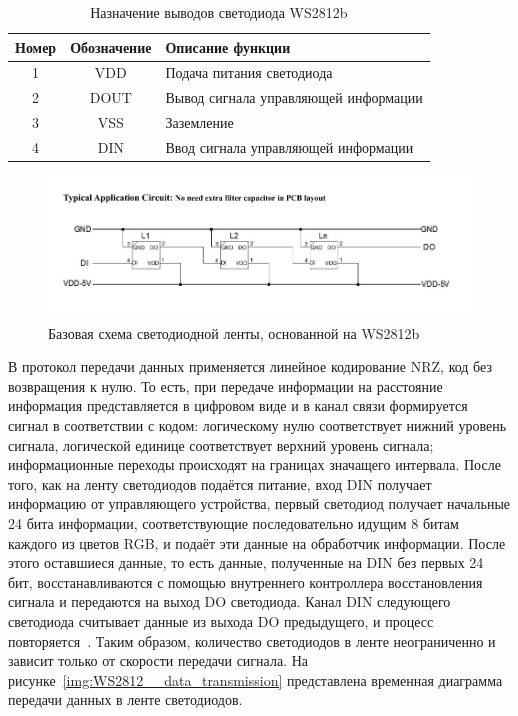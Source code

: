 \begin{table}[H]
  \caption{Назначение выводов светодиода WS2812b}
  \label{tab:ws2812__pin}
  \begin{tabular}{|c|c|l|}
  \hline
  Номер & Обозначение & Описание функции \\ \hline
  1 & VDD  & Подача питания светодиода            \\ \hline
  2 & DOUT & Вывод сигнала управляющей информации \\ \hline
  3 & VSS  & Заземление                           \\ \hline
  4 & DIN  & Ввод сигнала управляющей информации  \\ \hline
  \end{tabular}
  \end{table}

\begin{figure}[H]
  \centering
  \includegraphics[height=0.2\textheight]{assets/images/theoretical/Базовая схема светодиодной ленты.png}
  \caption{Базовая схема светодиодной ленты, основанной на WS2812b}
  \label{img:WS2812__strip}
\end{figure}


В протокол передачи данных применяется линейное кодирование NRZ, код без возвращения к нулю. То есть, при передаче информации на расстояние информация представляется в цифровом виде и в канал связи формируется сигнал в соответствии с кодом: логическому нулю соответствует нижний уровень сигнала, логической единице соответствует верхний уровень сигнала; информационные переходы происходят на границах значащего интервала. После того, как на ленту светодиодов подаётся питание, вход DIN получает информацию от управляющего устройства, первый светодиод получает начальные 24 бита информации, соответствующие последовательно идущим 8 битам каждого из цветов RGB, и подаёт эти данные на обработчик информации. После этого оставшиеся данные, то есть данные, полученные на DIN без первых 24 бит, восстанавливаются  с помощью внутреннего контроллера восстановления сигнала и передаются на выход DO светодиода. Канал DIN следующего светодиода считывает данные из выхода DO предыдущего, и процесс повторяется~\cite{Worldseim}. Таким образом, количество светодиодов в ленте неограниченно и зависит только от скорости передачи сигнала. На рисунке~\ref{img:WS2812__data_transmission} представлена временная диаграмма передачи данных в ленте светодиодов.

